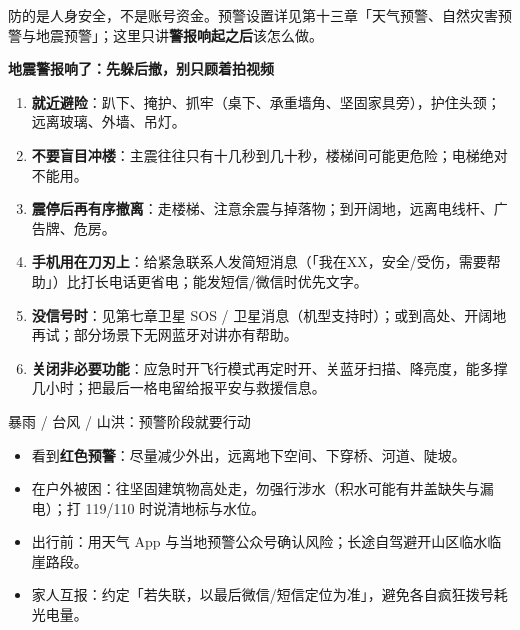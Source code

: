 


防的是人身安全，不是账号资金。预警设置详见第十三章「天气预警、自然灾害预警与地震预警」；这里只讲\textbf{警报响起之后}该怎么做。

\textbf{地震警报响了：先躲后撤，别只顾着拍视频}\par

\begin{enumerate}
  \item \textbf{就近避险}：趴下、掩护、抓牢（桌下、承重墙角、坚固家具旁），护住头颈；远离玻璃、外墙、吊灯。
  \item \textbf{不要盲目冲楼}：主震往往只有十几秒到几十秒，楼梯间可能更危险；电梯绝对不能用。
  \item \textbf{震停后再有序撤离}：走楼梯、注意余震与掉落物；到开阔地，远离电线杆、广告牌、危房。
  \item \textbf{手机用在刀刃上}：给紧急联系人发简短消息（「我在XX，安全/受伤，需要帮助」）比打长电话更省电；能发短信/微信时优先文字。
  \item \textbf{没信号时}：见第七章卫星 SOS / 卫星消息（机型支持时）；或到高处、开阔地再试；部分场景下无网蓝牙对讲亦有帮助。
  \item \textbf{关闭非必要功能}：应急时开飞行模式再定时开、关蓝牙扫描、降亮度，能多撑几小时；把最后一格电留给报平安与救援信息。
\end{enumerate}

\begin{tcbwarn}{暴雨 / 台风 / 山洪：预警阶段就要行动}
\begin{itemize}
  \item 看到\textbf{红色预警}：尽量减少外出，远离地下空间、下穿桥、河道、陡坡。
  \item 在户外被困：往坚固建筑物高处走，勿强行涉水（积水可能有井盖缺失与漏电）；打 119/110 时说清地标与水位。
  \item 出行前：用天气 App 与当地预警公众号确认风险；长途自驾避开山区临水临崖路段。
  \item 家人互报：约定「若失联，以最后微信/短信定位为准」，避免各自疯狂拨号耗光电量。
\end{itemize}

\end{tcbwarn}

